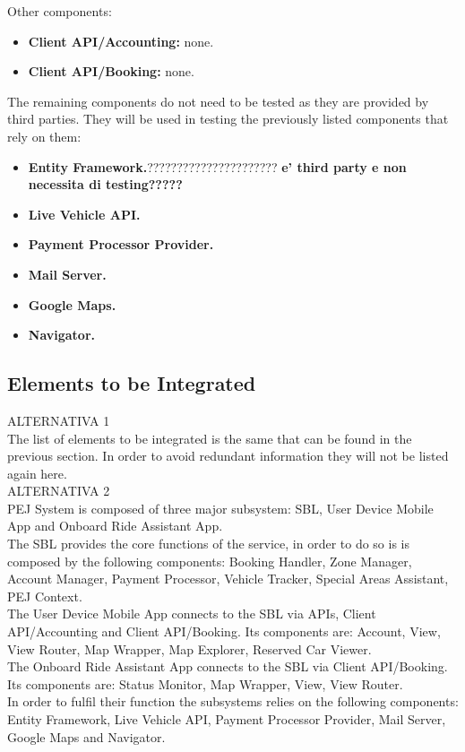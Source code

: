 Other components:
\begin{itemize}
    \item \textbf{Client API/Accounting:} none.
    \item \textbf{Client API/Booking:} none.
\end{itemize}
The remaining components do not need to be tested as they are provided by third parties. They will be used in testing the previously listed components that rely on them:
\begin{itemize}
    \item \textbf{Entity Framework.}?????????????????????? \textbf{e' third party e non necessita di testing?????}
    \item \textbf{Live Vehicle API.}
    \item \textbf{Payment Processor Provider.}
    \item \textbf{Mail Server.}
    \item \textbf{Google Maps.}
    \item \textbf{Navigator.}
\end{itemize}

\subsection{Elements to be Integrated}
ALTERNATIVA 1\\
The list of elements to be integrated is the same that can be found in the previous section. In order to avoid redundant information they will not be listed again here. 
\\ALTERNATIVA 2\\
PEJ System is composed of three major subsystem: SBL, User Device Mobile App and Onboard Ride Assistant App.\\
The SBL provides the core functions of the service, in order to do so is is composed by the following components: Booking Handler, Zone Manager, Account Manager, Payment Processor, Vehicle Tracker, Special Areas Assistant, PEJ Context.\\
The User Device Mobile App connects to the SBL via APIs, Client API/Accounting and Client API/Booking. Its components are: Account, View, View Router, Map Wrapper, Map Explorer, Reserved Car Viewer.\\
The Onboard Ride Assistant App connects to the SBL via Client API/Booking. Its components are: Status Monitor, Map Wrapper, View, View Router.\\
In order to fulfil their function the subsystems relies on the following components: Entity Framework, Live Vehicle API, Payment Processor Provider, Mail Server, Google Maps and Navigator.


